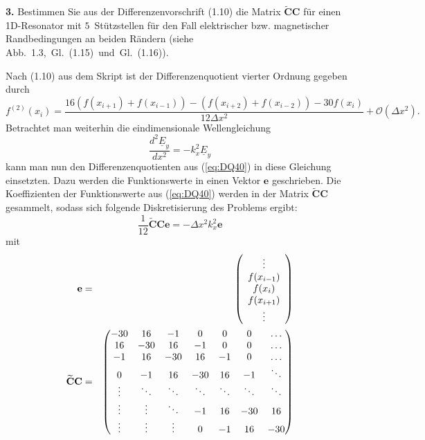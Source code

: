 \documentclass[Protokollheft.tex]{subfiles}
\begin{document}
    \begin{framed}
	\noindent \textbf{3.} Bestimmen Sie aus der Differenzenvorschrift (1.10) die Matrix $\tilde{\textbf{C}}\textbf{C}$ für einen 1D-Resonator mit $5$~Stützstellen für den Fall elektrischer bzw. magnetischer Randbedingungen an beiden Rändern (siehe Abb.~1.3,~Gl.~(1.15)~und~Gl.~(1.16)).\label{exer:matrixCC}
\end{framed}

Nach (1.10) aus dem Skript ist der Differenzenquotient vierter Ordnung gegeben durch
\begin{equation}
	\label{eq:DQ40}
	f^{(2)}(x_i)=\frac{16(f(x_{i+1})+f(x_{i-1}))-(f(x_{i+2})+f(x_{i-2}))-30f(x_i)}{12\Delta x^2}+\mathcal{O}(\Delta x^2).
\end{equation}
Betrachtet man weiterhin die eindimensionale Wellengleichung
\begin{equation*}
	\frac{d^2\underline{E}_y}{dx^2}=-k^2_x\underline{E}_y
\end{equation*}
kann man nun den Differenzenquotienten aus (\ref{eq:DQ40}) in diese Gleichung einsetzten. Dazu werden die Funktionswerte in einen Vektor $\mathbf{e}$ geschrieben. Die Koeffizienten der Funktionswerte aus (\ref{eq:DQ40}) werden in der Matrix $\mathbf{\widetilde{C}C}$ gesammelt, sodass sich folgende Diskretisierung des Problems ergibt:
\begin{equation}
	\label{eq:cc}
	\frac{1}{12}\mathbf{\widetilde{C}Ce}=-\Delta x^2k^2_x\mathbf{e}
\end{equation}
mit
\begin{eqnarray*}
\mathbf{e}&=&\left(\begin{array}{c} \vdots\\ f(x_{i-1})\\ f(x_i) \\ f(x_{i+1})\\
 \vdots\\\end{array}\right)\\
 \noindent
\mathbf{\widetilde{C}C}&=&\begin{pmatrix} -30 & 16 & -1 & 0 & 0 & 0 & \dots \\ 
16 & -30 & 16 & -1 & 0 & 0 & \dots\\ 
-1 & 16 & -30 & 16 & -1 & 0 & \dots\\ 
0 & -1 & 16 & -30 & 16 & -1 & \ddots\\ 
\vdots & \ddots & \ddots & \ddots & \ddots & \ddots & \ddots\\
\vdots & \vdots & \ddots & -1 & 16 & -30 & 16\\
\vdots & \vdots & \vdots & 0 & -1 & 16 & -30\\
\end{pmatrix}
\end{eqnarray*}
\end{document}
